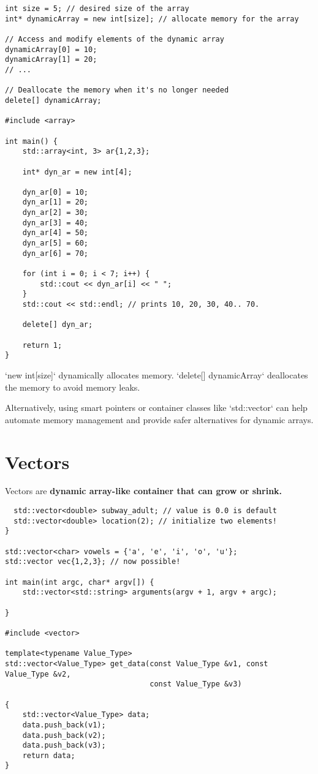 \begin{verbatim}
int size = 5; // desired size of the array
int* dynamicArray = new int[size]; // allocate memory for the array

// Access and modify elements of the dynamic array
dynamicArray[0] = 10;
dynamicArray[1] = 20;
// ...

// Deallocate the memory when it's no longer needed
delete[] dynamicArray;

#include <array>

int main() {
    std::array<int, 3> ar{1,2,3};

    int* dyn_ar = new int[4];

    dyn_ar[0] = 10;
    dyn_ar[1] = 20;
    dyn_ar[2] = 30;
    dyn_ar[3] = 40;
    dyn_ar[4] = 50;
    dyn_ar[5] = 60;
    dyn_ar[6] = 70;

    for (int i = 0; i < 7; i++) {
        std::cout << dyn_ar[i] << " ";
    }
    std::cout << std::endl; // prints 10, 20, 30, 40.. 70.

    delete[] dyn_ar;

    return 1;
}

\end{verbatim}

`new int[size]` dynamically allocates memory. 
`delete[] dynamicArray` deallocates the memory to avoid memory leaks.

Alternatively, using smart pointers or container classes like `std::vector` can help automate memory management
and provide safer alternatives for dynamic arrays.

\section{Vectors}

Vectors are \textbf{dynamic array-like container that can grow or shrink.}

\begin{verbatim}
  std::vector<double> subway_adult; // value is 0.0 is default
  std::vector<double> location(2); // initialize two elements! 
}

std::vector<char> vowels = {'a', 'e', 'i', 'o', 'u'};
std::vector vec{1,2,3}; // now possible! 

int main(int argc, char* argv[]) {
    std::vector<std::string> arguments(argv + 1, argv + argc);

}

#include <vector>

template<typename Value_Type>
std::vector<Value_Type> get_data(const Value_Type &v1, const Value_Type &v2,
                                 const Value_Type &v3)

{
    std::vector<Value_Type> data;
    data.push_back(v1);
    data.push_back(v2);
    data.push_back(v3);
    return data;
}
\end{verbatim}

